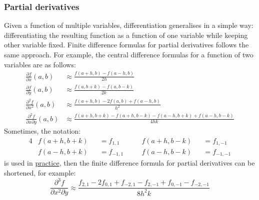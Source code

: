 \subsubsection{Partial derivatives}
Given a function of multiple variables, differentiation generalises in a simple way: differentiating the resulting function as a function of one variable while keeping other variable fixed. Finite difference formulas for partial derivatives follows the same approach. For example, the central difference formulas for a function of two variables are as follows:
\begin{align}
	\frac{\partial f}{\partial x}(a,b) &\approx \frac{f(a+h,b) - f(a-h,b)}{2h}  \\
	\frac{\partial f}{\partial y}(a,b) &\approx \frac{f(a,b+k) - f(a,b-k)}{2k}  \\
	\frac{\partial^2 f}{\partial x^2}(a,b) &\approx \frac{f(a+h,b) - 2f(a,b) + f(a-h,b)}{h^2}  \\
	\frac{\partial^2 f}{\partial x \partial y}(a,b) &\approx \frac{f(a+h,b+k) - f(a+h,b-k) - f(a-h,b+k) + f(a-h,b-k)}{4hk} 	
\end{align}    
Sometimes, the notation:
\begin{alignat*}{4}
	& f(a+h,b+k) &&= f_{1,1}  && \quad f(a+h,b-k) &&= f_{1,-1}  \\
	& f(a-h,b+k) &&= f_{-1,1} && \quad f(a-h,b-k) &&= f_{-1,-1} 
\end{alignat*}
is used in \href{https://www.uio.no/studier/emner/matnat/math/MAT-INF1100/h07/undervisningsmateriale/kap7.pdf}{practice}, then the finite difference formula for partial derivatives can be shortened, for example:
\begin{equation}
	\frac{\partial^3 f}{\partial x^2 \partial y} \approx \frac{f_{2,1} - 2f_{0,1} + f_{-2,1} - f_{2,-1} + f_{0,-1} - f_{-2,-1}}{8h^2k}
\end{equation}


